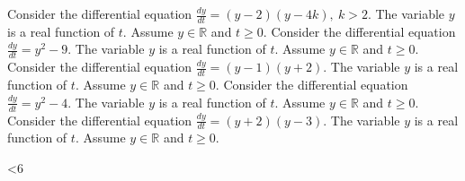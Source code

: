 \ifnum {}  
\question[8] Consider the differential equation $\displaystyle \frac{dy}{dt}= (y-2)(y-4k), \ k > 2$. The variable $y$ is a real function of $t$. Assume $y \in  \mathbb R$ and $t \ge 0$.
\fi
\ifnum {}  
\question[8] Consider the differential equation $\displaystyle \frac{dy}{dt}= y^2-9$. The variable $y$ is a real function of $t$. Assume $y \in  \mathbb R$ and $t \ge 0$.
\fi 
\ifnum {}
\question[8] Consider the differential equation $\displaystyle \frac{dy}{dt}= (y-1)(y+2)$. The variable $y$ is a real function of $t$. Assume $y \in  \mathbb R$ and $t \ge 0$.
\fi 
\ifnum {}
\question[8] Consider the differential equation $\displaystyle \frac{dy}{dt}= y^2-4$. The variable $y$ is a real function of $t$. Assume $y \in  \mathbb R$ and $t \ge 0$.
\fi 
\ifnum {}
\question[8] Consider the differential equation $\displaystyle \frac{dy}{dt}= (y+2)(y-3)$. The variable $y$ is a real function of $t$. Assume $y \in  \mathbb R$ and $t \ge 0$.
\fi 

\ifnum \Version<6
\fi


